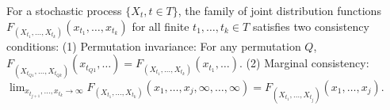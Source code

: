 For a stochastic process $\{X_t, t \in T\}$, the family of joint distribution functions $F_{(X_{t_1}, \ldots, X_{t_k})}(x_{t_1}, \ldots, x_{t_k})$ for all finite $t_1, \ldots, t_k \in T$ satisfies two consistency conditions:
(1) Permutation invariance: For any permutation $Q$, $F_{(X_{t_{Q1}}, \ldots, X_{t_{Qk}})}(x_{t_{Q1}}, \ldots) = F_{(X_{t_1}, \ldots, X_{t_k})}(x_{t_1}, \ldots)$.
(2) Marginal consistency: $\lim_{x_{t_{j+1}}, \ldots, x_{t_k} \to \infty} F_{(X_{t_1}, \ldots, X_{t_k})}(x_1, \ldots, x_j, \infty, \ldots, \infty) = F_{(X_{t_1}, \ldots, X_{t_j})}(x_1, \ldots, x_j)$.
